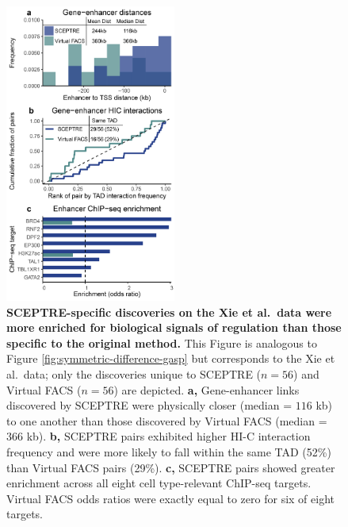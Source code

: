 \documentclass{article}
\begin{document}
  \clearpage
 \thispagestyle{empty} 
\begin{figure}
    \centering
	\includegraphics[width = 0.5\textwidth]{FigureS4.png}
	\caption{\textbf{SCEPTRE-specific discoveries on the Xie et al.\ data were more enriched for biological signals of regulation than those specific to the original method.} This Figure is analogous to Figure \ref{fig:symmetric-difference-gasp} but corresponds to the Xie et al.\ data; only the discoveries unique to SCEPTRE ($n = 56$) and Virtual FACS ($n = 56$) are depicted. \textbf{a,} Gene-enhancer links discovered by SCEPTRE were physically closer (median = $116$ kb) to one another than those discovered by Virtual FACS (median = $366$ kb). \textbf{b,} SCEPTRE pairs exhibited higher HI-C interaction frequency and were more likely to fall within the same TAD (52\%) than Virtual FACS pairs (29\%). \textbf{c,} SCEPTRE pairs showed greater enrichment across all eight cell type-relevant ChIP-seq targets. Virtual FACS odds ratios were exactly equal to zero for six of eight targets.}
	\label{fig:symmetric-difference-xie}
 \end{figure}
 
\end{document}
